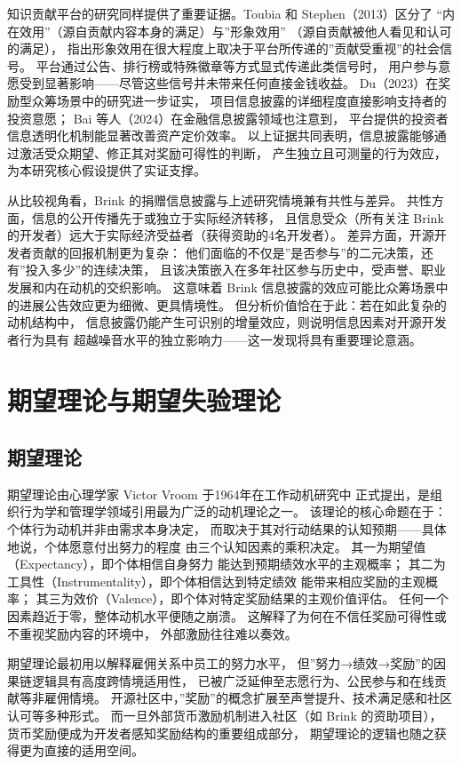 知识贡献平台的研究同样提供了重要证据。Toubia 和 Stephen（2013）区分了
“内在效用”（源自贡献内容本身的满足）与”形象效用”
（源自贡献被他人看见和认可的满足），
指出形象效用在很大程度上取决于平台所传递的”贡献受重视”的社会信号\cite{toubia2013intrinsic}。
平台通过公告、排行榜或特殊徽章等方式显式传递此类信号时，
用户参与意愿受到显著影响——尽管这些信号并未带来任何直接金钱收益。
Du（2023）在奖励型众筹场景中的研究进一步证实，
项目信息披露的详细程度直接影响支持者的投资意愿\cite{du2023impact}；
Bai 等人（2024）在金融信息披露领域也注意到，
平台提供的投资者信息透明化机制能显著改善资产定价效率\cite{bai2024platform}。
以上证据共同表明，信息披露能够通过激活受众期望、修正其对奖励可得性的判断，
产生独立且可测量的行为效应，为本研究核心假设提供了实证支撑。

从比较视角看，Brink 的捐赠信息披露与上述研究情境兼有共性与差异。
共性方面，信息的公开传播先于或独立于实际经济转移，
且信息受众（所有关注 Brink 的开发者）远大于实际经济受益者（获得资助的4名开发者）。
差异方面，开源开发者贡献的回报机制更为复杂：
他们面临的不仅是”是否参与”的二元决策，还有”投入多少”的连续决策，
且该决策嵌入在多年社区参与历史中，受声誉、职业发展和内在动机的交织影响。
这意味着 Brink 信息披露的效应可能比众筹场景中的进展公告效应更为细微、更具情境性。
但分析价值恰在于此：若在如此复杂的动机结构中，
信息披露仍能产生可识别的增量效应，则说明信息因素对开源开发者行为具有
超越噪音水平的独立影响力——这一发现将具有重要理论意涵。

\section{期望理论与期望失验理论}

\subsection{期望理论}

期望理论由心理学家 Victor Vroom 于1964年在工作动机研究中
正式提出\cite{vroom1964work}，是组织行为学和管理学领域引用最为广泛的动机理论之一。
该理论的核心命题在于：个体行为动机并非由需求本身决定，
而取决于其对行动结果的认知预期——具体地说，个体愿意付出努力的程度
由三个认知因素的乘积决定。
其一为期望值（Expectancy），即个体相信自身努力
能达到预期绩效水平的主观概率；
其二为工具性（Instrumentality），即个体相信达到特定绩效
能带来相应奖励的主观概率；
其三为效价（Valence），即个体对特定奖励结果的主观价值评估。
任何一个因素趋近于零，整体动机水平便随之崩溃。
这解释了为何在不信任奖励可得性或不重视奖励内容的环境中，
外部激励往往难以奏效。

期望理论最初用以解释雇佣关系中员工的努力水平，
但”努力→绩效→奖励”的因果链逻辑具有高度跨情境适用性，
已被广泛延伸至志愿行为、公民参与和在线贡献等非雇佣情境。
开源社区中，”奖励”的概念扩展至声誉提升、技术满足感和社区认可等多种形式。
而一旦外部货币激励机制进入社区（如 Brink 的资助项目），
货币奖励便成为开发者感知奖励结构的重要组成部分，
期望理论的逻辑也随之获得更为直接的适用空间。

